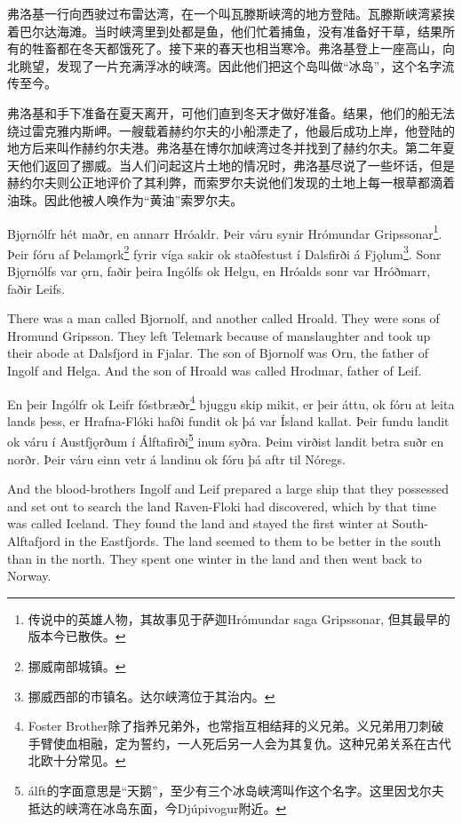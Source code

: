 \begin{translation*}{}
    弗洛基一行向西驶过布雷达湾，在一个叫瓦滕斯峡湾的地方登陆。瓦滕斯峡湾紧挨着巴尔达海滩。当时峡湾里到处都是鱼，他们忙着捕鱼，没有准备好干草，结果所有的牲畜都在冬天都饿死了。接下来的春天也相当寒冷。弗洛基登上一座高山，向北眺望，发现了一片充满浮冰的峡湾。因此他们把这个岛叫做“冰岛”，这个名字流传至今。

    弗洛基和手下准备在夏天离开，可他们直到冬天才做好准备。结果，他们的船无法绕过雷克雅内斯岬。一艘载着赫约尔夫的小船漂走了，他最后成功上岸，他登陆的地方后来叫作赫约尔夫港。弗洛基在博尔加峡湾过冬并找到了赫约尔夫。第二年夏天他们返回了挪威。当人们问起这片土地的情况时，弗洛基尽说了一些坏话，但是赫约尔夫则公正地评价了其利弊，而索罗尔夫说他们发现的土地上每一根草都滴着油珠。因此他被人唤作为“黄油”索罗尔夫。
\end{translation*}

\begin{paracol}{2}
    Bjǫrnólfr hét maðr, en annarr Hróaldr. Þeir váru synir Hrómundar Gripssonar\footnote{传说中的英雄人物，其故事见于萨迦Hrómundar saga Gripssonar, 但其最早的版本今已散佚。}. Þeir fóru af Þelamǫrk\footnote{挪威南部城镇。} fyrir víga sakir ok staðfestust í Dalsfirði á Fjǫlum\footnote{挪威西部的市镇名。达尔峡湾位于其治内。}. Sonr Bjǫrnólfs var ǫrn, faðir þeira Ingólfs ok Helgu, en Hróalds sonr var Hróðmarr, faðir Leifs.
    \switchcolumn

    There was a man called Bjornolf, and another called Hroald. They were sons of Hromund Gripsson. They left Telemark because of manslaughter and took up their abode at Dalsfjord in Fjalar. The son of Bjornolf was Orn, the father of Ingolf and Helga. And the son of Hroald was called Hrodmar, father of Leif.
\end{paracol}

\begin{paracol}{2}
    En þeir Ingólfr ok Leifr fóstbræðr\footnote{Foster Brother除了指养兄弟外，也常指互相结拜的义兄弟。义兄弟用刀刺破手臂使血相融，定为誓约，一人死后另一人会为其复仇。这种兄弟关系在古代北欧十分常见。} bjuggu skip mikit, er þeir áttu, ok fóru at leita lands þess, er Hrafna-Flóki hafði fundit ok þá var Ísland kallat. Þeir fundu landit ok váru í Austfjǫrðum í Álftafirði\footnote{álft的字面意思是“天鹅”，至少有三个冰岛峡湾叫作这个名字。这里因戈尔夫抵达的峡湾在冰岛东面，今Djúpivogur附近。} inum syðra. Þeim virðist landit betra suðr en norðr. Þeir váru einn vetr á landinu ok fóru þá aftr til Nóregs.
    \switchcolumn

    And the blood-brothers Ingolf and Leif prepared a large ship that they possessed and set out to search the land Raven-Floki had discovered, which by that time was called Iceland. They found the land and stayed the first winter at South-Alftafjord in the Eastfjords. The land seemed to them to be better in the south than in the north. They spent one winter in the land and then went back to Norway.
\end{paracol}

